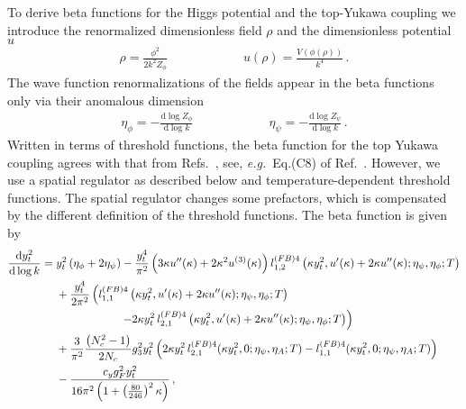 \documentclass[aps,prd,11pt,tightenlines,superscriptaddress,nofootinbib,preprintnumbers,notitlepage]{revtex4-1}
\newcommand{\qqqquad}{\qquad \qquad \qquad}
\newcommand{\eg}{\textsl{e.g.}\;}
\begin{document}
To derive beta functions for the Higgs potential and the top-Yukawa
coupling we introduce the renormalized dimensionless field $\rho$ and
the dimensionless potential $u$
%
\begin{align}
 \rho = \frac{\phi^2}{2 k^2 Z_\phi}
 \qqqquad
 u(\rho) = \frac{V(\phi(\rho))}{k^4} \,.
\end{align}
%
The wave function renormalizations of the fields appear in the beta
functions only via their anomalous dimension
%
\begin{align}
 \eta_\phi = - \frac{\mathrm d \log Z_\phi }{\mathrm d \log k} 
 \qqqquad 
 \eta_\psi = - \frac{\mathrm d \log Z_\psi }{\mathrm d \log k} \,.
\end{align}
%
Written in terms of threshold functions, the beta function for the top
Yukawa coupling agrees with that from 
Refs.~\cite{our_paper,Gies:2013fua}, see, \eg~Eq.(C8) of
Ref.~\cite{our_paper}. However, we use a spatial regulator as
described below and temperature-dependent threshold functions. The
spatial regulator changes some prefactors, which is compensated by the
different definition of the threshold functions. The beta function is
given by
%
\begin{align} \label{eq:flow-eq-yuk} \frac{\mathrm d y_t^2}{\mathrm d
    \log k} ={}& y_t^2 \left(\eta_\phi+2 \eta_\psi\right) -
  \frac{y_t^4}{\pi^2} \left(3 \kappa u''(\kappa) + 2 \kappa^2
    u^{(3)}(\kappa)\right) l_{1,2}^{(FB)4}\left(\kappa
    y_t^2,u'(\kappa) + 2 \kappa
    u''(\kappa);\eta_\psi,\eta_\phi;T\right)
                 \notag \\
               &+ \frac{y_t^4}{2\pi^2}
                 \left(l_{1,1}^{(FB)4}\left(\kappa y_t^2,u'(\kappa) +
                 2 \kappa u''(\kappa);\eta_\psi,\eta_\phi;T\right)
                 \right. \notag \\
               &\left.\hspace{2cm}-2 \kappa y_t^2
                 \,l_{2,1}^{(FB)4}\left(\kappa y_t^2,u'(\kappa) + 2
                 \kappa u''(\kappa);\eta_\psi,\eta_\phi;T\right)
                 \right)
                 \notag \\
               &+\frac{3}{\pi^2} \frac{\left(N_c^2-1\right)}{2N_c}
                 g_3^2 y_t^2 \left(2 \kappa y_t^2\,
                 l_{2,1}^{(FB)4}(\kappa y_t^2,0;\eta_\psi,\eta_A;T)
                 - l_{1,1}^{(FB)4}(\kappa y_t^2,0;\eta_\psi,\eta_A;T)\right) \notag\\
               &-\frac{c_y g_F^2 y_t^2}{16 \pi ^2 \left(1+
                 \left(\frac{80}{246}\right)^2\kappa\right)}\,,
\end{align}
\end{document}
